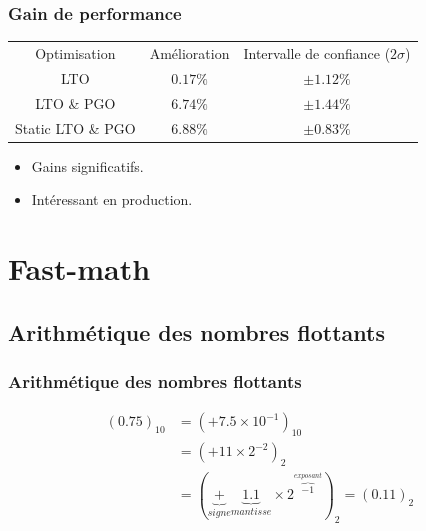 \documentclass{beamer}
\begin{document}
\begin{frame}[fragile]
    \frametitle{Gain de performance}

    \begin{center}
        \begin{tabular}{ c c c }
            Optimisation      & Amélioration & Intervalle de confiance ($2\sigma$) \\
            LTO               & $0.17\%$     & $\pm 1.12\%$                        \\
            LTO \& PGO        & $6.74\%$     & $\pm 1.44\%$                        \\
            Static LTO \& PGO & $6.88\%$     & $\pm 0.83\%$
        \end{tabular}
    \end{center}

    \begin{itemize}
        \item Gains significatifs.
        \item Intéressant en production.
    \end{itemize}
\end{frame}

\section{Fast-math}

\begin{frame}
    \tableofcontents[currentsection]
\end{frame}

\subsection{Arithmétique des nombres flottants}

\begin{frame}
    \frametitle{Arithmétique des nombres flottants}

    \begin{displaymath}
        \begin{split}
            (0.75)_{10} & = (+ 7.5 \times 10^{-1})_{10} \\
            & = (+11 \times 2^{-2})_{2} \\
            & = (\underbrace{+}_{signe} \underbrace{1.1}_{mantisse} \times 2^{\overbrace{-1}^{exposant}})_{2} = (0.11)_{2}
        \end{split}
    \end{displaymath}
\end{frame}
\end{document}
